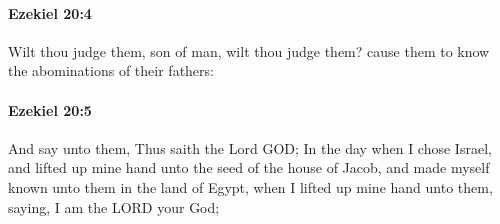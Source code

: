 		\paragraph{Ezekiel 20:4} %
			\label{EZEKIEL-20-4}

			Wilt thou judge them, son of man, wilt thou judge them? cause them to know the abominations of their fathers:


		\paragraph{Ezekiel 20:5} %
			\label{EZEKIEL-20-5}

			And say unto them, Thus saith the Lord GOD; In the day when I chose Israel, and lifted up mine hand unto the seed of the house of Jacob, and made myself known unto them in the land of Egypt, when I lifted up mine hand unto them, saying, I am the LORD your God;


